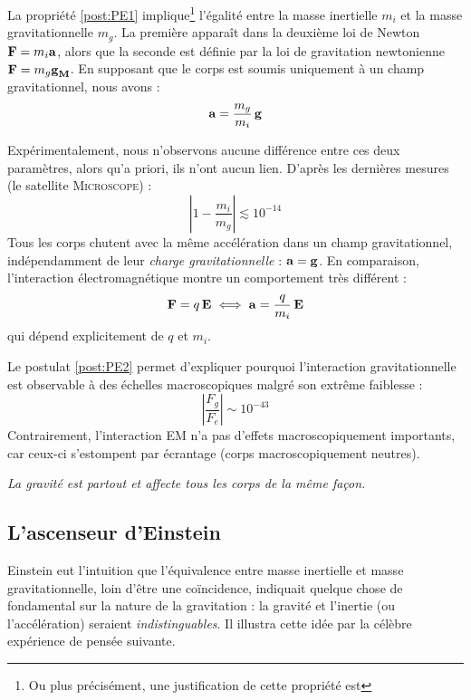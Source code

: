 \begin{rmk}
    La propriété \ref{post:PE1} implique\footnote{Ou plus précisément, une justification de cette propriété est} l'égalité entre la masse inertielle $m_i$ et la masse gravitationnelle $m_g$. La première apparaît dans la deuxième loi de Newton $\bm{\mathrm{F}} =m_{i}\bm{\mathrm{a}}$, alors que la seconde est définie par la loi de gravitation newtonienne $\bm{\mathrm{F}} =m_{g}\bm{\mathrm{g}}_\mathbf{M}$. En supposant que le corps est soumis uniquement à un champ gravitationnel, nous avons :
    \begin{equation}
        \bm{\mathrm{a}} = \frac{m_g}{m_i} \, \bm{\mathrm{g}}
    \end{equation}

    Expérimentalement, nous n'observons aucune différence entre ces deux paramètres, alors qu'a priori, ils n'ont aucun lien. D'après les dernières mesures (le satellite \textsc{Microscope}) :
    \begin{equation}
        \left| 1 - \frac{m_i}{m_g} \right| \lesssim 10^{-14}
    \end{equation}
    Tous les corps chutent avec la même accélération dans un champ gravitationnel, indépendamment de leur \emph{charge gravitationnelle} : $\bm{\mathrm{a}} = \bm{\mathrm{g}}$. En comparaison, l'interaction électromagnétique montre un comportement très différent :
    \begin{equation}
        \bm{\mathrm{F}} = q \, \bm{\mathrm{ E}} \iff \bm{\mathrm{a}} = \frac{q}{m_i} \, \bm{\mathrm{E}}
    \end{equation}
    qui dépend explicitement de $q$ et $m_i$.
\end{rmk}
\begin{rmk}
    Le postulat \ref{post:PE2} permet d'expliquer pourquoi l'interaction gravitationnelle est observable à des échelles macroscopiques malgré son extrême faiblesse :
    \begin{equation}
        \left| \frac{F_g}{F_e}\right| \sim 10^{-43}
        \label{force gravité}
    \end{equation}
    Contrairement, l'interaction EM n'a pas d'effets macroscopiquement importants, car ceux-ci s'estompent par écrantage (corps macroscopiquement neutres).
\end{rmk}
\begin{center}
        \textit{La gravité est partout et affecte tous les corps de la même façon.}
    \end{center}
\subsection{L'ascenseur d'Einstein}
Einstein eut l'intuition que l'équivalence entre masse inertielle et masse gravitationnelle, loin d'être une coïncidence, indiquait quelque chose de fondamental sur la nature de la gravitation : la gravité et l'inertie (ou l'accélération) seraient \emph{indistinguables}. Il illustra cette idée par la célèbre expérience de pensée suivante.

